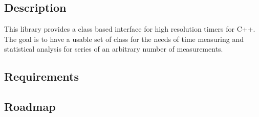 \subsection*{Description}

This library provides a class based interface for high resolution timers for C++. The goal is to have a usable set of class for the needs of time measuring and statistical analysis for series of an arbitrary number of measurements.

\subsection*{Requirements}

\subsection*{Roadmap}